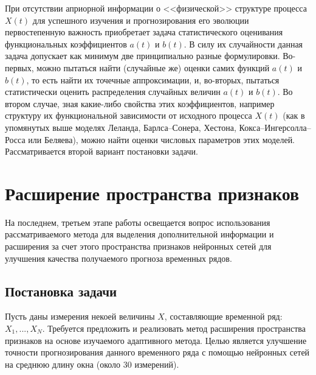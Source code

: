 \documentclass[oneside,senior,etd]{BYUPhys}
\newcommand{\todo}[1]{\textcolor{red}{#1}}
\begin{document}
		При отсутствии априорной информации о <<физической>> структуре процесса $X(t)$ для успешного изучения и прогнозирования его эволюции первостепенную важность приобретает задача  статистического оценивания функциональных коэффициентов $a(t)$ и $b(t)$. В силу их случайности данная задача допускает как минимум две принципиально разные формулировки. Во-первых, можно пытаться найти (случайные же) оценки самих функций $a(t)$ и $b(t)$, то есть найти их точечные аппроксимации, и, во-вторых, пытаться статистически оценить распределения случайных величин $a(t)$ и $b(t)$. Во втором случае, зная какие-либо свойства этих коэффициентов, например структуру их функциональной зависимости от исходного процесса $X(t)$ (как в упомянутых выше моделях Леланда, Барлса--Сонера, Хестона, Кокса--Ингерсолла--Росса или Беляева), можно найти оценки числовых параметров этих моделей.
		\\
		
		Рассматривается второй вариант постановки задачи.
		
        
\section{Расширение пространства признаков}
    На последнем, третьем этапе работы освещается вопрос использования рассматриваемого метода для выделения дополнительной информации и расширения за счет этого пространства признаков нейронных сетей для улучшения качества получаемого прогноза временных рядов. 
    
    \subsection{Постановка задачи}
	    Пусть даны измерения некоей величины $X$, составляющие временной ряд: $X_1, ..., X_N$. Требуется предложить и реализовать метод расширения пространства признаков на основе изучаемого адаптивного метода. Целью является улучшение точности прогнозирования данного временного ряда с помощью нейронных сетей на среднюю длину окна (около 30 измерений).
	    
\end{document}
